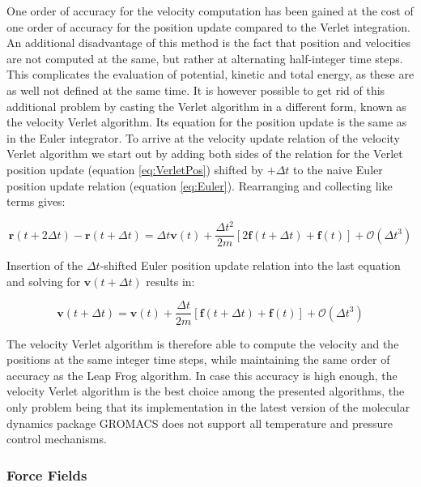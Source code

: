 \documentclass[english, a4paper, 12pt, titlepage, draft]{article}
\newcommand{\vect}[1]{\mathbf{#1}}
\newcommand{\vfun}[2]{\vect{#1}\left(#2\right)}
\begin{document}
\noindent
One order of accuracy for the velocity computation has been gained at the cost of one order of accuracy for the position update compared to the Verlet integration.
An additional disadvantage of this method is the fact that position and velocities are not computed at the same, but rather at alternating half-integer time steps.
This complicates the evaluation of potential, kinetic and total energy, as these are as well not defined at the same time.
It is however possible to get rid of this additional problem by casting the Verlet algorithm in a different form, known as the velocity Verlet algorithm.
Its equation for the position update is the same as in the Euler integrator.
To arrive at the velocity update relation of the velocity Verlet algorithm we start out by adding both sides of the relation for the Verlet position update (equation \ref{eq:VerletPos}) shifted by $+\Delta t$ to the naive Euler position update relation (equation \ref{eq:Euler}).
Rearranging and collecting like terms gives:

\begin{equation}
    \vfun{r}{t+2\Delta t} - \vfun{r}{t+\Delta t} = \Delta t \vfun{v}{t} + \frac{\Delta t^2}{2m} \left[ 2\vfun{f}{t+\Delta t} + \vfun{f}{t} \right] + \mathcal{O}(\Delta t^3)
\end{equation}

\noindent
Insertion of the $\Delta t$-shifted Euler position update relation into the last equation and solving for $\vfun{v}{t+\Delta t}$ results in:

\begin{equation}
    \vfun{v}{t+\Delta t} = \vfun{v}{t} + \frac{\Delta t}{2m} \left[ \vfun{f}{t+\Delta t} + \vfun{f}{t}\right]  + \mathcal{O}(\Delta t^3)
\end{equation}

\noindent
The velocity Verlet algorithm is therefore able to compute the velocity and the positions at the same integer time steps, while maintaining the same order of accuracy as the Leap Frog algorithm.
In case this accuracy is high enough, the velocity Verlet algorithm is the best choice among the presented algorithms, the only problem being that its implementation in the latest version of the molecular dynamics package GROMACS \cite{GROMACS4} does not support all temperature and pressure control mechanisms.


\subsubsection{Force Fields}
\label{sec:forcefields}
\end{document}
